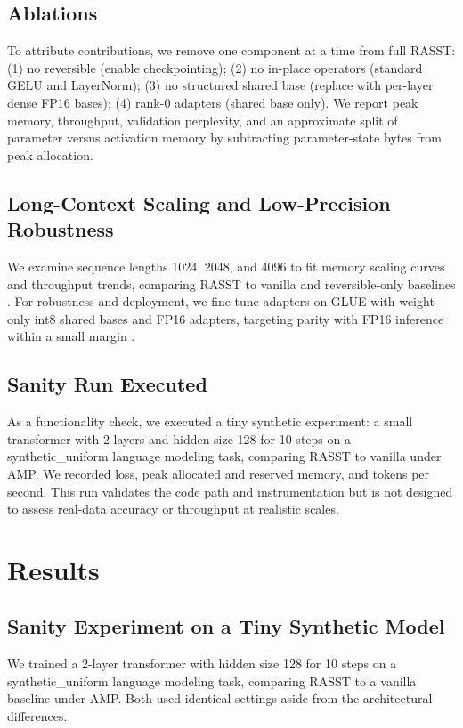 \documentclass{article}
\begin{document}
\subsection{Ablations}
To attribute contributions, we remove one component at a time from full RASST: (1) no reversible (enable checkpointing); (2) no in-place operators (standard GELU and LayerNorm); (3) no structured shared base (replace with per-layer dense FP16 bases); (4) rank-0 adapters (shared base only). We report peak memory, throughput, validation perplexity, and an approximate split of parameter versus activation memory by subtracting parameter-state bytes from peak allocation.

\subsection{Long-Context Scaling and Low-Precision Robustness}
We examine sequence lengths 1024, 2048, and 4096 to fit memory scaling curves and throughput trends, comparing RASST to vanilla and reversible-only baselines \cite{liu-2023-blockwise}. For robustness and deployment, we fine-tune adapters on GLUE with weight-only int8 shared bases and FP16 adapters, targeting parity with FP16 inference within a small margin \cite{sehanobish-2024-structured}.

\subsection{Sanity Run Executed}
As a functionality check, we executed a tiny synthetic experiment: a small transformer with 2 layers and hidden size 128 for 10 steps on a synthetic\_uniform language modeling task, comparing RASST to vanilla under AMP. We recorded loss, peak allocated and reserved memory, and tokens per second. This run validates the code path and instrumentation but is not designed to assess real-data accuracy or throughput at realistic scales.

\section{Results}
\subsection{Sanity Experiment on a Tiny Synthetic Model}
We trained a 2-layer transformer with hidden size 128 for 10 steps on a synthetic\_uniform language modeling task, comparing RASST to a vanilla baseline under AMP. Both used identical settings aside from the architectural differences.
\end{document}

